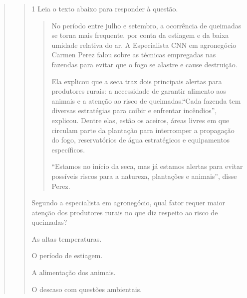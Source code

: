 \begin{quote}
\begin{quote}
\num{1} Leia o texto abaixo para responder à questão.

\begin{quote}

No período entre julho e setembro, a ocorrência de queimadas se torna
mais frequente, por conta da estiagem e da baixa umidade relativa do ar.
A Especialista CNN em agronegócio Carmen Perez falou sobre as técnicas
empregadas nas fazendas para evitar que o fogo se alastre e cause
destruição.

Ela explicou que a seca traz dois principais alertas para produtores
rurais: a necessidade de garantir alimento aos animais e a atenção ao
risco de queimadas.``Cada fazenda tem diversas estratégias para coibir e
enfrentar incêndios'', explicou. Dentre elas, estão os aceiros, áreas
livres em que circulam parte da plantação para interromper a propagação do
fogo, reservatórios de água estratégicos e equipamentos específicos.

``Estamos no início da seca, mas já estamos alertas para evitar
possíveis riscos para a natureza, plantações e animais'', disse Perez.

\end{quote}


Segundo a especialista em agronegócio, qual fator requer maior atenção
dos produtores rurais no que diz respeito ao risco de queimadas?

\begin{escolha}
    
    \item As altas temperaturas.
    
    \item O período de estiagem.
    
    \item A alimentação dos animais.
    
    \item O descaso com questões ambientais.

\end{escolha}

  

\end{quote}
\end{quote}
